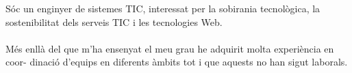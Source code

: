 \documentclass[9pt]{developercv} %
\begin{document}
\vspace{0.5cm}



\begin{minipage}[t]{0.4\textwidth} %
	\vspace{-\baselineskip} %
    Sóc un enginyer de sistemes
	TIC, interessat per la sobirania tecnològica, la
	sostenibilitat dels serveis TIC i les tecnologies
	Web.
    \\
    \\
    Més enllà del que m’ha ensenyat el meu
	grau he adquirit molta experiència en coor-
	dinació d’equips en diferents àmbits tot i que
	aquests no han sigut laborals.
\end{minipage}
\hfill %
\begin{minipage}[t]{0.5\textwidth} %
	\vspace{-\baselineskip} %
	\begin{barchart}{5.5}
	\end{barchart}
\end{minipage}


\end{document}
